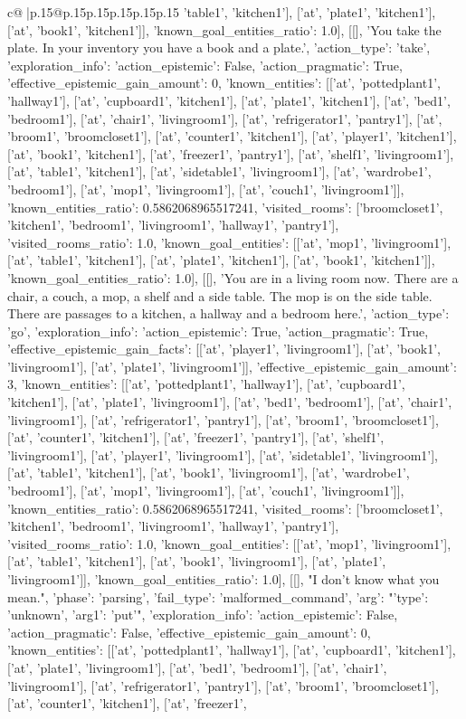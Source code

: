 \documentclass{article}
\begin{document}
{\begin{supertabular}{c@{$\;$}|p{.15\linewidth}@{}p{.15\linewidth}p{.15\linewidth}p{.15\linewidth}p{.15\linewidth}p{.15\linewidth}}
{{{'table1', 'kitchen1'], ['at', 'plate1', 'kitchen1'], ['at', 'book1', 'kitchen1']], 'known_goal_entities_ratio': 1.0}}], [[], 'You take the plate. In your inventory you have a book and a plate.', {'action_type': 'take', 'exploration_info': {'action_epistemic': False, 'action_pragmatic': True, 'effective_epistemic_gain_amount': 0, 'known_entities': [['at', 'pottedplant1', 'hallway1'], ['at', 'cupboard1', 'kitchen1'], ['at', 'plate1', 'kitchen1'], ['at', 'bed1', 'bedroom1'], ['at', 'chair1', 'livingroom1'], ['at', 'refrigerator1', 'pantry1'], ['at', 'broom1', 'broomcloset1'], ['at', 'counter1', 'kitchen1'], ['at', 'player1', 'kitchen1'], ['at', 'book1', 'kitchen1'], ['at', 'freezer1', 'pantry1'], ['at', 'shelf1', 'livingroom1'], ['at', 'table1', 'kitchen1'], ['at', 'sidetable1', 'livingroom1'], ['at', 'wardrobe1', 'bedroom1'], ['at', 'mop1', 'livingroom1'], ['at', 'couch1', 'livingroom1']], 'known_entities_ratio': 0.5862068965517241, 'visited_rooms': ['broomcloset1', 'kitchen1', 'bedroom1', 'livingroom1', 'hallway1', 'pantry1'], 'visited_rooms_ratio': 1.0, 'known_goal_entities': [['at', 'mop1', 'livingroom1'], ['at', 'table1', 'kitchen1'], ['at', 'plate1', 'kitchen1'], ['at', 'book1', 'kitchen1']], 'known_goal_entities_ratio': 1.0}}], [[], 'You are in a living room now. There are a chair, a couch, a mop, a shelf and a side table. The mop is on the side table. There are passages to a kitchen, a hallway and a bedroom here.', {'action_type': 'go', 'exploration_info': {'action_epistemic': True, 'action_pragmatic': True, 'effective_epistemic_gain_facts': [['at', 'player1', 'livingroom1'], ['at', 'book1', 'livingroom1'], ['at', 'plate1', 'livingroom1']], 'effective_epistemic_gain_amount': 3, 'known_entities': [['at', 'pottedplant1', 'hallway1'], ['at', 'cupboard1', 'kitchen1'], ['at', 'plate1', 'livingroom1'], ['at', 'bed1', 'bedroom1'], ['at', 'chair1', 'livingroom1'], ['at', 'refrigerator1', 'pantry1'], ['at', 'broom1', 'broomcloset1'], ['at', 'counter1', 'kitchen1'], ['at', 'freezer1', 'pantry1'], ['at', 'shelf1', 'livingroom1'], ['at', 'player1', 'livingroom1'], ['at', 'sidetable1', 'livingroom1'], ['at', 'table1', 'kitchen1'], ['at', 'book1', 'livingroom1'], ['at', 'wardrobe1', 'bedroom1'], ['at', 'mop1', 'livingroom1'], ['at', 'couch1', 'livingroom1']], 'known_entities_ratio': 0.5862068965517241, 'visited_rooms': ['broomcloset1', 'kitchen1', 'bedroom1', 'livingroom1', 'hallway1', 'pantry1'], 'visited_rooms_ratio': 1.0, 'known_goal_entities': [['at', 'mop1', 'livingroom1'], ['at', 'table1', 'kitchen1'], ['at', 'book1', 'livingroom1'], ['at', 'plate1', 'livingroom1']], 'known_goal_entities_ratio': 1.0}}], [[], "I don't know what you mean.", {'phase': 'parsing', 'fail_type': 'malformed_command', 'arg': "{'type': 'unknown', 'arg1': 'put'}", 'exploration_info': {'action_epistemic': False, 'action_pragmatic': False, 'effective_epistemic_gain_amount': 0, 'known_entities': [['at', 'pottedplant1', 'hallway1'], ['at', 'cupboard1', 'kitchen1'], ['at', 'plate1', 'livingroom1'], ['at', 'bed1', 'bedroom1'], ['at', 'chair1', 'livingroom1'], ['at', 'refrigerator1', 'pantry1'], ['at', 'broom1', 'broomcloset1'], ['at', 'counter1', 'kitchen1'], ['at', 'freezer1', }}}
\end{supertabular}}
\end{document}
